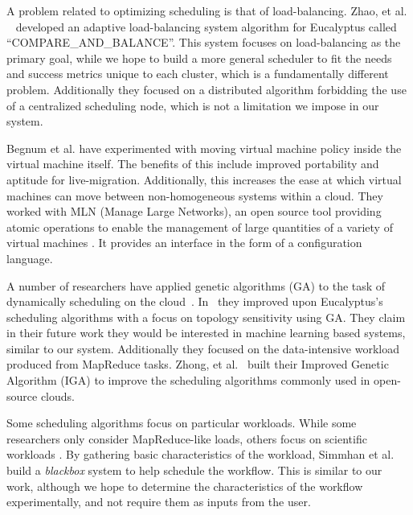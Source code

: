 A problem related to optimizing scheduling is that of load-balancing.  Zhao,
et al. ~\cite{Zhao} developed an adaptive load-balancing system algorithm for
Eucalyptus called ``COMPARE\_AND\_BALANCE''.  This system focuses on
load-balancing as the primary goal, while we hope to build a more general
scheduler to fit the needs and success metrics unique to each cluster, which is
a fundamentally different problem.  Additionally they focused on a distributed
algorithm forbidding the use of a centralized scheduling node, which is not a
limitation we impose in our system.


Begnum et al. \cite{Begnum} have experimented with moving virtual machine policy
inside the virtual machine itself.  The benefits of this include improved
portability and aptitude for live-migration.  Additionally, this increases the
ease at which virtual machines can move between non-homogeneous systems within a
cloud.  They worked with MLN (Manage Large Networks), an open source tool
providing atomic operations to enable the management of large quantities of a
variety of virtual machines \cite{Xen,UML,VMware}.  It provides an interface in
the form of a configuration language.


A number of researchers have applied genetic algorithms (GA) to the task of
dynamically scheduling on the cloud~\cite{Lee,Zhong,Chenhong}.  In~\cite{Lee}
they improved upon Eucalyptus's scheduling algorithms with a focus on topology
sensitivity using GA.  They claim in their future work they would be interested
in machine learning based systems, similar to our system.  Additionally they
focused on the data-intensive workload produced from MapReduce tasks. Zhong, et
al.~\cite{Zhong} built their Improved Genetic Algorithm (IGA) to improve the
scheduling algorithms commonly used in open-source clouds.



Some scheduling algorithms focus on particular workloads.  While some
researchers only consider MapReduce-like loads, others focus on scientific
workloads \cite{Juve,Simmhan,Hoffa}.  By gathering basic characteristics of the
workload, Simmhan et al.~\cite{Simmhan} build a \emph{blackbox} system to help
schedule the workflow.  This is similar to our work, although we hope to
determine the characteristics of the workflow experimentally, and not require
them as inputs from the user.
